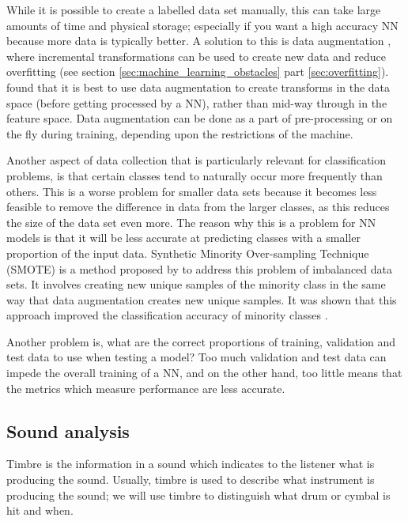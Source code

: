 \documentclass[12pt]{article}
\begin{document}
	While it is possible to create a labelled data set manually, this can take large amounts of time and physical storage; especially if you want a high accuracy NN because more data is typically better. A solution to this is data augmentation \parencite{gmsw2016}, where incremental transformations can be used to create new data and reduce overfitting (see section \ref{sec:machine_learning_obstacles} part  \ref{sec:overfitting}). \textcite{gmsw2016} found that it is best to use data augmentation to create transforms in the data space (before getting processed by a NN), rather than mid-way through in the feature space. Data augmentation can be done as a part of pre-processing or on the fly during training, depending upon the restrictions of the machine.\medskip
	
	Another aspect of data collection that is particularly relevant for classification problems, is that certain classes tend to naturally occur more frequently than others. This is a worse problem for smaller data sets because it becomes less feasible to remove the difference in data from the larger classes, as this reduces the size of the data set even more. The reason why this is a problem for NN models is that it will be less accurate at predicting classes with a smaller proportion of the input data. Synthetic Minority Over-sampling Technique (SMOTE) is a method proposed by \textcite{Chawla2002} to address this problem of imbalanced data sets.
	It involves creating new unique samples of the minority class in the same way that data augmentation creates new unique samples. It was shown that this approach improved the classification accuracy of minority classes \parencite{Chawla2002}.
	
	Another problem is, what are the correct proportions of training, validation and test data to use when testing a model? Too much validation and test data can impede the overall training of a NN, and on the other hand, too little means that the metrics which measure performance are less accurate.\medskip
	
	\subsection{Sound analysis}\label{sec:sound_analysis}
	Timbre is the information in a sound which indicates to the listener what is producing the sound. Usually, timbre is used to describe what instrument is producing the sound; we will use timbre to distinguish what drum or cymbal is hit and when.\medskip
	
\end{document}
